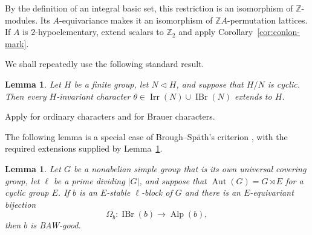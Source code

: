 \documentclass[10pt]{amsart}
\newtheorem{lemma}[theorem]{Lemma}
\theoremstyle{definition}
\let\oldendproof\endproof
\renewenvironment{proof}[1][\proofname]{%
  \oldproof[\bfseries #1]%
}{\oldendproof}
\DeclareMathOperator{\Aut}{Aut}
\DeclareMathOperator{\IBr}{IBr}
\DeclareMathOperator{\Irr}{Irr}
\DeclareMathOperator{\Alp}{Alp}
\newcommand{\Z}{\mathbb Z}
\numberwithin{equation}{section}
\numberwithin{table}{section}
\begin{document}
\begin{proof}
By the definition of an integral basic set, this restriction is an
isomorphism of $\Z$-modules.  Its $A$-equivariance makes it an isomorphism
of $\Z A$-permutation lattices.
If $A$ is $2$-hypoelementary, extend scalars to $\Z_2$ and apply
Corollary~\ref{cor:conlon-mark}.
\end{proof}

We shall repeatedly use the following standard result.

\begin{lemma}\label{lem:cyclic-extension}
Let $H$ be a finite group, let $N\triangleleft H$, and suppose that $H/N$ is
cyclic. Then every $H$-invariant character $\theta\in\Irr(N)\cup\IBr(N)$ extends to $H$.
\end{lemma}

\begin{proof}
Apply \cite[Corollary~11.22]{Isaacs1976} for ordinary characters and
\cite[Theorem~8.12]{Navarro1998} for Brauer characters.
\end{proof}

The following lemma is a special case of Brough--Sp\"ath's criterion
\cite[Theorem~3.18]{FengLiZhang2022Jordan}, with the required extensions
supplied by Lemma~\ref{lem:cyclic-extension}.

\begin{lemma}\label{lem:cyclic-outer-baw}
Let $G$ be a nonabelian simple group that is its own universal covering
group, let $\ell$ be a prime dividing $|G|$, and suppose that
$\Aut(G)=G\rtimes E$ for a cyclic group $E$.  If $b$ is an $E$-stable
$\ell$-block of $G$ and there is an $E$-equivariant bijection
\[
  \Omega_b:\IBr(b)\longrightarrow\Alp(b),
\]
then $b$ is BAW-good.
\end{lemma}
\end{document}
